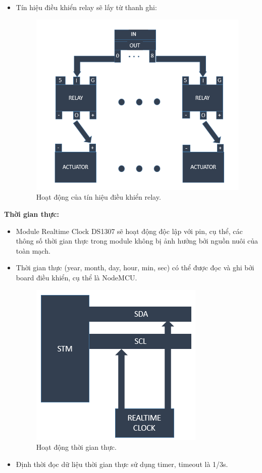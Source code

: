 \documentclass[a4paper,12pt,oneside]{article}
\begin{document}
\begin{itemize}
\item Tín hiệu điều khiển relay sẽ lấy từ thanh ghi: \\

\begin{figure}[H]
	\centering
	\includegraphics[scale=0.7]{hinh/register_relay.PNG}
	\caption{Hoạt động của tín hiệu điều khiển relay.}
\end{figure}

\end{itemize}
\noindent \textbf{Thời gian thực:}

\begin{itemize}
\item Module Realtime Clock DS1307 sẽ hoạt động độc lập với pin, cụ thể, các thông số thời gian thực trong module không bị ảnh hưởng bởi nguồn nuôi của toàn mạch.
\item Thời gian thực (year, month, day, hour, min, sec) có thể được đọc và ghi bởi board điều khiển, cụ thể là NodeMCU.

\begin{figure}[H]
	\centering
	\includegraphics[scale=0.8]{hinh/stm_realtime.PNG}
	\caption{Hoạt động thời gian thực.}
\end{figure}

\item Định thời đọc dữ liệu thời gian thực sử dụng timer, timeout là 1/3s.

\end{itemize}
\end{document}
